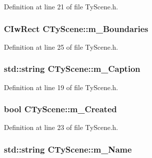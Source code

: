 Definition at line 21 of file TyScene.h.

\hypertarget{class_c_ty_scene_a5cbe320d312e3909c6ad4c32c99ed275}{
\subsubsection[{m\_\-Boundaries}]{\setlength{\rightskip}{0pt plus 5cm}CIwRect {\bf CTyScene::m\_\-Boundaries}}}
\label{class_c_ty_scene_a5cbe320d312e3909c6ad4c32c99ed275}


Definition at line 25 of file TyScene.h.

\hypertarget{class_c_ty_scene_a7ebea53f2e91d94f3f6ba6aef7a40f5b}{
\subsubsection[{m\_\-Caption}]{\setlength{\rightskip}{0pt plus 5cm}std::string {\bf CTyScene::m\_\-Caption}}}
\label{class_c_ty_scene_a7ebea53f2e91d94f3f6ba6aef7a40f5b}


Definition at line 19 of file TyScene.h.

\hypertarget{class_c_ty_scene_a165009b2d0b79de7bcd4c0594931ec70}{
\subsubsection[{m\_\-Created}]{\setlength{\rightskip}{0pt plus 5cm}bool {\bf CTyScene::m\_\-Created}}}
\label{class_c_ty_scene_a165009b2d0b79de7bcd4c0594931ec70}


Definition at line 23 of file TyScene.h.

\hypertarget{class_c_ty_scene_ad81b920909340266c2aba88805f7812a}{
\subsubsection[{m\_\-Name}]{\setlength{\rightskip}{0pt plus 5cm}std::string {\bf CTyScene::m\_\-Name}}}
\label{class_c_ty_scene_ad81b920909340266c2aba88805f7812a}


